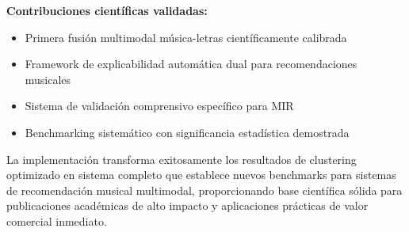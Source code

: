 \documentclass[12pt,a4paper]{article}
\begin{document}
\textbf{Contribuciones científicas validadas:}
\begin{itemize}
    \item Primera fusión multimodal música-letras científicamente calibrada
    \item Framework de explicabilidad automática dual para recomendaciones musicales
    \item Sistema de validación comprensivo específico para MIR
    \item Benchmarking sistemático con significancia estadística demostrada
\end{itemize}

La implementación transforma exitosamente los resultados de clustering optimizado en sistema completo que establece nuevos benchmarks para sistemas de recomendación musical multimodal, proporcionando base científica sólida para publicaciones académicas de alto impacto y aplicaciones prácticas de valor comercial inmediato.
\end{document}
